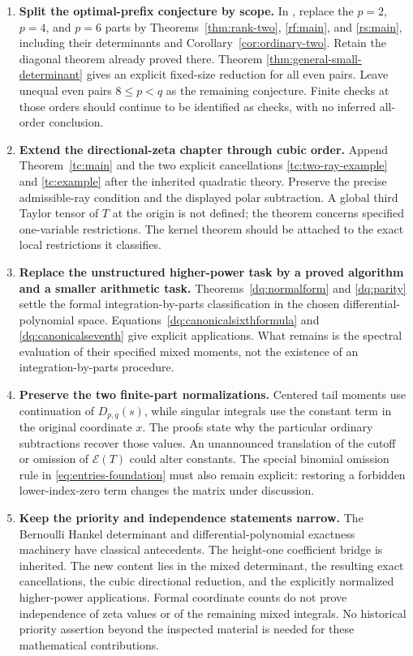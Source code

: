 \documentclass[11pt,a4paper]{article}
\numberwithin{equation}{section}
\theoremstyle{plain}
\theoremstyle{definition}
\theoremstyle{remark}
\begin{document}
\begin{enumerate}[leftmargin=*,label=\arabic*.]
\item \textbf{Split the optimal-prefix conjecture by scope.}
In \cite[\texttt{conj:firstq}]{CanonicalFifth}, replace the $p=2$,
$p=4$, and $p=6$ parts by Theorems~\ref{thm:rank-two}, \ref{rf:main},
and \ref{rs:main},
including their determinants and Corollary~\ref{cor:ordinary-two}.
Retain the diagonal theorem already proved there. Theorem
\ref{thm:general-small-determinant} gives an explicit fixed-size
reduction for all even pairs. Leave unequal even pairs $8\le p<q$
as the remaining conjecture. Finite checks at those orders should continue to be identified
as checks, with no inferred all-order conclusion.

\item \textbf{Extend the directional-zeta chapter through cubic order.}
Append Theorem~\ref{tc:main} and the two explicit cancellations
\eqref{tc:two-ray-example} and \eqref{tc:example} after the inherited
quadratic theory. Preserve the precise admissible-ray condition and
the displayed polar subtraction. A global third Taylor tensor of $T$
at the origin is not defined; the theorem concerns specified one-variable
restrictions. The kernel theorem should be attached to the exact local
restrictions it classifies.

\item \textbf{Replace the unstructured higher-power task by a proved
algorithm and a smaller arithmetic task.}
Theorems~\ref{dq:normalform} and \ref{dq:parity} settle the formal
integration-by-parts classification in the chosen differential-polynomial
space. Equations~\eqref{dq:canonicalsixthformula} and
\eqref{dq:canonicalseventh} give explicit applications. What remains is
the spectral evaluation of their specified mixed moments, not the
existence of an integration-by-parts procedure.

\item \textbf{Preserve the two finite-part normalizations.}
Centered tail moments use continuation of $D_{p,q}(s)$, while singular
integrals use the constant term in the original coordinate $x$.
The proofs state why the particular ordinary subtractions recover those
values. An unannounced translation of the cutoff or omission of
$\mathcal E(T)$ could alter constants. The special binomial omission
rule in \eqref{eq:entries-foundation} must also remain explicit: restoring
a forbidden lower-index-zero term changes the matrix under discussion.

\item \textbf{Keep the priority and independence statements narrow.}
The Bernoulli Hankel determinant and differential-polynomial exactness
machinery have classical antecedents. The height-one coefficient bridge
is inherited. The new content lies in the mixed determinant, the
resulting exact cancellations, the cubic directional reduction, and the
explicitly normalized higher-power applications. Formal coordinate counts
do not prove independence of zeta values or of the remaining mixed
integrals. No historical priority assertion beyond the inspected material
is needed for these mathematical contributions.
\end{enumerate}
\end{document}
